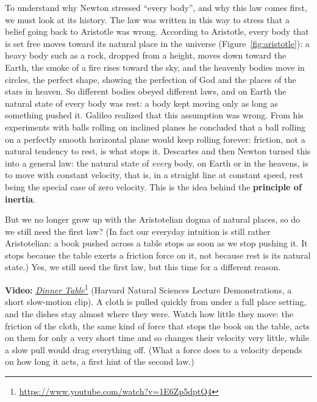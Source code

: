 \documentclass[11pt,a4paper]{article}
\begin{document}
To understand why Newton stressed ``every body'', and why this law comes first, we must look at
its history. The law was written in this way to stress that a belief going back to Aristotle was
wrong. According to Aristotle, every body that is set free moves toward its natural place in the
universe (Figure~\ref{fig:aristotle}): a heavy body such as a rock, dropped from a height, moves
down toward the Earth, the smoke of a fire rises toward the sky, and the heavenly bodies move in
circles, the perfect shape, showing the perfection of God and the places of the stars in heaven.
So different bodies obeyed different laws, and on Earth the natural state of every body was rest: a
body kept moving only as long as something pushed it. Galileo realized that this assumption was
wrong. From his experiments with balls rolling on inclined planes he concluded that a ball rolling
on a perfectly smooth horizontal plane would keep rolling forever: friction, not a natural tendency
to rest, is what stops it. Descartes and then Newton turned this into a general law: the natural
state of \emph{every} body, on Earth or in the heavens, is to move with constant velocity, that is,
in a straight line at constant speed, rest being the special case of zero velocity. This is the
idea behind the \textbf{principle of inertia}.

But we no longer grow up with the Aristotelian dogma of natural places, so do we still need the
first law? (In fact our everyday intuition is still rather Aristotelian: a book pushed across a
table stops as soon as we stop pushing it. It stops because the table exerts a friction force on
it, not because rest is its natural state.) Yes, we still need the first law, but this time for a
different reason.

\begin{aside}
\textbf{Video:}
\href{https://www.youtube.com/watch?v=1E6Zp5dptQ4}{\emph{Dinner
Table}}\footnote{\url{https://www.youtube.com/watch?v=1E6Zp5dptQ4}} (Harvard Natural Sciences
Lecture Demonstrations, a short slow-motion clip). A cloth is pulled quickly from under a full place
setting, and the dishes stay almost where they were. Watch how little they move: the friction of
the cloth, the same kind of force that stops the book on the table, acts on them for only a very
short time and so changes their velocity very little, while a slow pull would drag everything off.
(What a force does to a velocity depends on how long it acts, a first hint of the second law.)
\end{aside}
\end{document}
